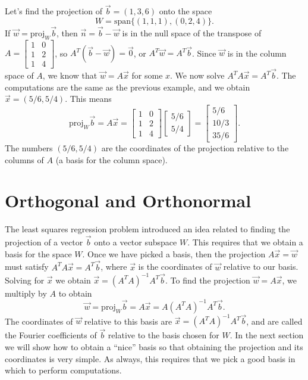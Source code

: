 \begin{example}
Let's find the projection of $\vec b = (1,3,6)$ onto the space $$W=\text{span}\{(1,1,1),(0,2,4)\}.$$ If $\vec w =\text{proj}_{W}\vec b$, then $\vec n=\vec b-\vec w$ is in the null space of the transpose of $A = \begin{bmatrix}1&0\\1&2\\1&4\end{bmatrix}$, so $A^T(\vec b - \vec w)=\vec 0$, or $A^T\vec w =A^T\vec b$.  Since $\vec w$ is in the column space of $A$, we know that $\vec w = A\vec x$ for some $x$.  We now solve $A^T A \vec x = A^T\vec b$. The computations are the same as the previous example, and we obtain $\vec x = (5/6,5/4)$.  This means 
$$\text{proj}_W\vec b = A\vec x = \begin{bmatrix}1&0\\1&2\\1&4\end{bmatrix}\begin{bmatrix}5/6\\5/4\end{bmatrix} = \begin{bmatrix} 
 {5}/{6} \\
 {10}/{3} \\
 {35}/{6}
\end{bmatrix}.$$
The numbers $(5/6,5/4)$ are the coordinates of the projection relative to the columns of $A$ (a basis for the column space).
\end{example}







\section{Orthogonal and Orthonormal}

The least squares regression problem introduced an idea related to finding the projection of a vector $\vec b$ onto a vector subspace $W$.  This requires that we obtain a basis for the space $W$. Once we have picked a basis, then the projection $A\vec x=\vec w$ must satisfy $A^TA\vec x = A^T\vec b$, where $\vec x$ is the coordinates of $\vec w$ relative to our basis. Solving for $\vec x$ we obtain $\vec x = (A^T A)^{-1}A^T \vec b$. To find the projection $\vec w = A\vec x$, we multiply by $A$ to obtain $$\vec w = \text{proj}_W \vec b =  A\vec x = A(A^T A)^{-1}A^T \vec b.$$ The coordinates of $\vec w$ relative to this basis are $\vec x = (A^T A)^{-1}A^T \vec b$, and are called the Fourier coefficients of $\vec b$ relative to the basis chosen for $W$.
In the next section we will show how to obtain a ``nice'' basis so that obtaining the projection and its coordinates is very simple. As always, this requires that we pick a good basis in which to perform computations.


